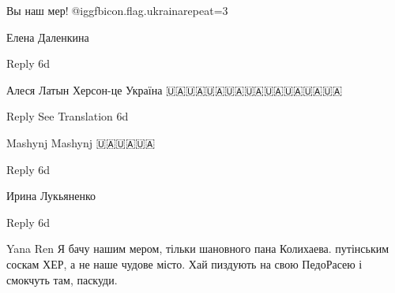 \begin{itemize}
Вы наш мер!🙏@igg{fbicon.flag.ukraina}{repeat=3}

Елена Даленкина
💙💛🇺🇦

    Reply
    6d

Алеся Латын
Херсон-це Україна 🇺🇦🇺🇦🇺🇦🇺🇦🇺🇦🇺🇦🇺🇦🇺🇦🇺🇦

    Reply
    See Translation
    6d

Mashynj Mashynj
🇺🇦🇺🇦🇺🇦

    Reply
    6d

Ирина Лукьяненко
💙💛

    Reply
    6d

Yana Ren
Я бачу нашим мером, тільки шановного пана Колихаева. путінським соскам ХЕР, а не наше чудове місто. Хай пиздують на свою ПедоРасею і смокчуть там, паскуди.

\end{itemize} %
